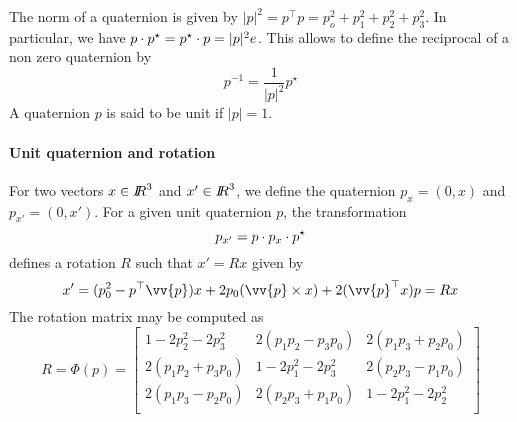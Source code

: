 The norm of a quaternion is given by $|p|^2=p^\top p = p_o^2+p_1^2+p_2^2+p_3^2$. In particular, we have $p \cdot p^\star = p^\star \cdot p = |p|^2 e$. This allows to define the reciprocal of a non zero quaternion by
\begin{equation}
  \label{eq:78}
  p ^{-1} = \frac 1 {|p|^2} p^\star
\end{equation}
A quaternion $p$ is said to be unit if $|p| =1$. 

\paragraph{Unit quaternion and rotation}
For two vectors $x\in \mbox{\rm $I\!\!R$}^3$ and $x'\in \mbox{\rm $I\!\!R$}^3$, we define the quaternion $p_x = (0,x)$ and  $p_{x'} = (0,x')$.
For a given unit quaternion $p$, the transformation
\begin{equation}
  \label{eq:79}
  p_{x'} = p \cdot p_x \cdot  p^\star 
\end{equation}
defines a rotation $R$ such that $x'  = R x$ given by
\begin{equation}
  \label{eq:80}
  x' = (p_0^2- p^\top \vv{p}) x +2 p_0(\vv{p}\times x) +  2 (\vv{p}^\top x) p = R x
\end{equation}
The rotation matrix may be computed as 
\begin{equation}
  \label{eq:81}
  R = \Phi(p) =
  \begin{bmatrix}
    1-2 p_2^2- 2 p_3^2 & 2(p_1p_2-p_3p_0) & 2(p_1p_3+p_2p_0)\\
    2(p_1p_2+p_3p_0) & 1-2 p_1^2- 2 p_3^2 & 2(p_2p_3-p_1p_0)\\
    2(p_1p_3-p_2p_0) & 2(p_2p_3+p_1p_0)  & 1-2 p_1^2- 2 p_2^2\\
  \end{bmatrix}
\end{equation} 


